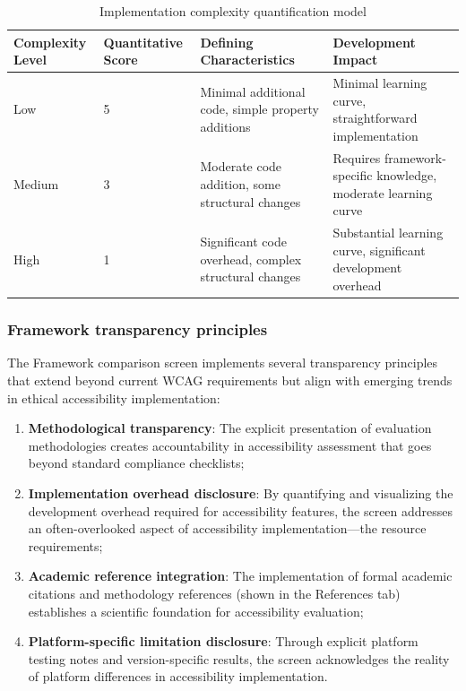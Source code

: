\begin{table}[ht]
\caption{Implementation complexity quantification model}
\label{tab:implementation_complexity_model}
\centering
\begin{tabular}{|C{3cm}|C{3.5cm}|C{3.5cm}|C{4cm}|}
\hline
\textbf{Complexity Level} & \textbf{Quantitative Score} & \textbf{Defining Characteristics} & \textbf{Development Impact} \\
\hline
Low & 5 & Minimal additional code, simple property additions & Minimal learning curve, straightforward implementation \\
\hline
Medium & 3 & Moderate code addition, some structural changes & Requires framework-specific knowledge, moderate learning curve \\
\hline
High & 1 & Significant code overhead, complex structural changes & Substantial learning curve, significant development overhead \\
\hline
\end{tabular}
\end{table}

\FloatBarrier

\subsubsection{Framework transparency principles}
\label{subsubsec:framework-transparency-principles}

The Framework comparison screen implements several transparency principles that extend beyond current WCAG requirements but align with emerging trends in ethical accessibility implementation:

\begin{enumerate}
    \item \textbf{Methodological transparency}: The explicit presentation of evaluation methodologies creates accountability in accessibility assessment that goes beyond standard compliance checklists;
    
    \item \textbf{Implementation overhead disclosure}: By quantifying and visualizing the development overhead required for accessibility features, the screen addresses an often-overlooked aspect of accessibility implementation—the resource requirements;
    
    \item \textbf{Academic reference integration}: The implementation of formal academic citations and methodology references (shown in the References tab) establishes a scientific foundation for accessibility evaluation;
    
    \item \textbf{Platform-specific limitation disclosure}: Through explicit platform testing notes and version-specific results, the screen acknowledges the reality of platform differences in accessibility implementation.
\end{enumerate}

